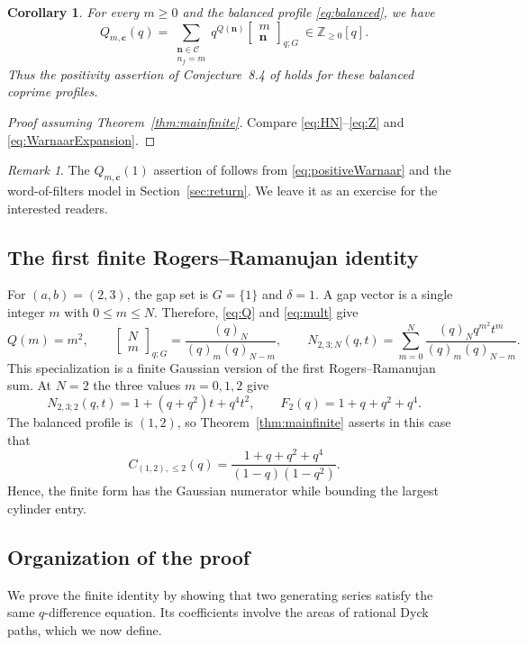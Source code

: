 \documentclass[12pt,reqno]{amsart}
\numberwithin{equation}{section}
\newtheorem{corollary}[theorem]{Corollary}
\theoremstyle{definition}
\theoremstyle{remark}
\newtheorem*{remark}{Remark}
\theoremstyle{plain}
\newcommand{\NN}{\mathbb Z_{\ge0}}
\newcommand{\nn}{\mathbf n}
\newcommand{\cc}{\mathbf c}
\newcommand{\mult}[2]{\left[\begin{matrix}#1\\#2\end{matrix}\right]_{q;G}}
\begin{document}
\begin{corollary}\label{cor:Warnaar}
For every $m\ge0$ and the balanced profile \eqref{eq:balanced}, we have
\begin{equation}\label{eq:positiveWarnaar}
 Q_{m,\cc}(q)=
 \sum_{\substack{\nn\in\mathcal C\\n_f=m}}
       q^{Q(\nn)}\mult m\nn\ \in\NN[q].
\end{equation}
Thus the positivity assertion of Conjecture~8.4 of \cite{Warnaar} holds for these balanced coprime
profiles.
\end{corollary}
\begin{proof}
    [Proof assuming Theorem~\ref{thm:mainfinite}]
    Compare \eqref{eq:HN}--\eqref{eq:Z} and \eqref{eq:WarnaarExpansion}.
\end{proof}
\begin{remark}
    The $Q_{m,\cc}(1)$ assertion of \cite[Conjecture~8.4]{Warnaar} follows from \eqref{eq:positiveWarnaar} and the word-of-filters model in Section~\ref{sec:return}. We leave it as an exercise for the interested readers.
\end{remark}


\subsection{\texorpdfstring{The first finite Rogers--Ramanujan identity}{The first finite Rogers--Ramanujan identity}}\label{subsec:runninggap}

For $(a,b)=(2,3)$, the gap set is $G=\{1\}$ and $\delta=1$.
A gap vector is a single integer $m$ with $0\le m\le N$. Therefore, \eqref{eq:Q} and \eqref{eq:mult} give
\[
 Q(m)=m^2,\qquad
 \mult Nm=\frac{(q)_N}{(q)_m(q)_{N-m}},\qquad
 N_{2,3;N}(q,t)=\sum_{m=0}^{N}\frac{(q)_N q^{m^2}t^m}{(q)_m(q)_{N-m}}.
\]
This specialization is a finite Gaussian version of the first Rogers--Ramanujan sum. At $N=2$ the three values $m=0,1,2$ give
\begin{equation}\label{eq:exampleF2}
 N_{2,3;2}(q,t)=1+(q+q^2)t+q^4t^2,
 \qquad F_2(q)=1+q+q^2+q^4.
\end{equation}
The balanced profile is $(1,2)$, so Theorem~\ref{thm:mainfinite} asserts in this case that
\[
 C_{(1,2),\le2}(q)=\frac{1+q+q^2+q^4}{(1-q)(1-q^2)}.
\]
Hence, the finite form has the Gaussian numerator while bounding the largest cylinder entry.



\subsection{Organization of the proof}\label{subsec:roadmap}
We prove the finite identity by showing that two generating series satisfy
the same $q$-difference equation.  Its coefficients involve the areas of
rational Dyck paths, which we now define.
\end{document}
